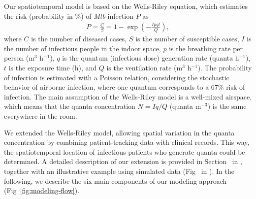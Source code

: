 \documentclass[fleqn,11pt]{wlscirep}
\begin{document}
Our spatiotemporal model is based on the Wells-Riley equation\cite{Riley1961Book}, which estimates the risk (probability in \%) of \emph{Mtb} infection $P$ as
\begin{align}
    P = \frac{C}{S} = 1 - \exp\left(-\frac{Ipqt}{Q}\right),
\end{align}
where $C$ is the number of diseased cases, $S$ is the number of susceptible cases, $I$ is the number of infectious people in the indoor space, $p$ is the breathing rate per person (m$^3$ h$^{-1}$), $q$ is the quantum (infectious dose) generation rate (quanta h$^{-1}$), $t$ is the exposure time (h), and $Q$ is the ventilation rate (m$^3$ h$^{-1}$). The probability of infection is estimated with a Poisson relation, considering the stochastic behavior of airborne infection, where one quantum corresponds to a 67\% risk of infection. The main assumption of the Wells-Riley model is a well-mixed airspace, which means that the quanta concentration $N = Iq/Q$ (quanta m$^{-3}$) is the same everywhere in the room. 

We extended the Wells-Riley model, allowing spatial variation in the quanta concentration by combining patient-tracking data with clinical records. This way, the spatiotemporal location of infectious patients who generate quanta could be determined. A detailed description of our extension is provided in Section~ in \supp, together with an illustrative example using simulated data (Fig~ in \supp). In the following, we describe the six main components of our modeling approach (Fig~\ref{fig:modeling-flow}).
\end{document}
